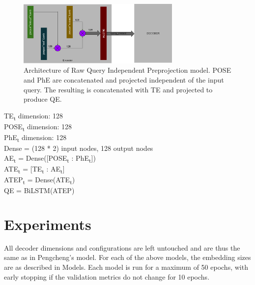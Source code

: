 \documentclass{IEEEtran}
\begin{document}
        \begin{figure}[h]
          \centering
          \includegraphics[width=8cm]{advlp.png}
          \caption{Architecture of Raw Query Independent Preprojection model. POSE and PhE are
          concatenated and projected independent of the input query. The resulting is 
          concatenated with TE and projected to produce QE.}
          \label{fig:advlp}
        \end{figure}

        \hspace*{-3.5mm}TE\textsubscript{t} dimension: 128 \\
        POSE\textsubscript{t} dimension: 128 \\
        PhE\textsubscript{t} dimension: 128 \\
        Dense = (128 * 2) input nodes, 128 output nodes \\ 

        \hspace*{-3.5mm}AE\textsubscript{t} = Dense([POSE\textsubscript{t} : 
        PhE\textsubscript{t}]) \\
        ATE\textsubscript{t} = [TE\textsubscript{t} : AE\textsubscript{t}] \\
        ATEP\textsubscript{t} = Dense(ATE\textsubscript{t}) \\
        QE = BiLSTM(ATEP) \\


    \section{Experiments}
    All decoder dimensions and configurations are left untouched and are thus the same as in
    Pengcheng's model. For each of the above models, the embedding sizes are as described in 
    Models. Each model is run for a maximum of 50 epochs, with early stopping if the validation
    metrics do not change for 10 epochs.
\end{document}
